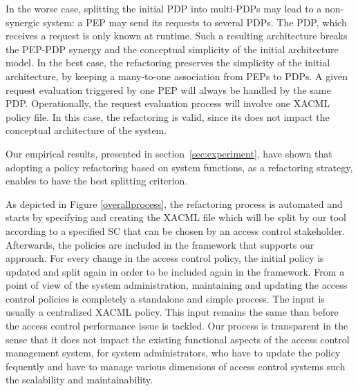 In the worse case, splitting the initial PDP into multi-PDPs may lead to a non-synergic system: a PEP may send its requests to several PDPs. 
The PDP, which receives a request is only known at runtime. Such a resulting architecture breaks the PEP-PDP synergy and the conceptual 
simplicity of the initial architecture model. 
In the best case, the refactoring preserves the simplicity of the initial architecture, by keeping a many-to-one association from PEPs to PDPs. A given request evaluation 
triggered by one PEP will always be handled by the same PDP. Operationally, the request evaluation process will involve 
one XACML policy file. In this case, the refactoring is valid, since its does not impact the conceptual architecture of the system.

  


Our empirical results, presented in section~\ref{sec:experiment}, have shown that adopting a policy refactoring based on system functions, as a refactoring strategy, enables to 
have the best splitting criterion. 

 
As depicted in Figure \ref{overallprocess}, the refactoring process is automated and starts by specifying and creating the XACML file which 
will be split by our tool according to a specified SC that can be chosen by an access control stakeholder. Afterwards, the policies are included in the 
framework that supports our approach. For every change in the access control policy, the initial policy is updated and 
split again in order to be included again in the framework.
From a point of view of the system administration, maintaining and updating the access control policies is completely a standalone and simple
 process. The input is usually a centralized XACML policy. This input remains the same than before the access control performance issue is tackled.
Our process is transparent in the sense that it does not impact the existing functional aspects of the access control management system, 
for system administrators, who have to update the policy fequently and have to manage various dimensions of access control 
systems such the scalability and maintainability.